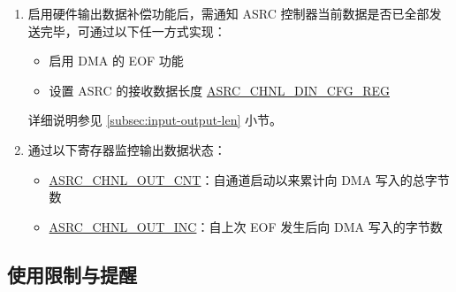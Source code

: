 \documentclass[main\_\_CN.tex]{subfiles}
\begin{document}
\begin{enumerate}
  \item 启用硬件输出数据补偿功能后，需通知 ASRC 控制器当前数据是否已全部发送完毕，可通过以下任一方式实现：

  \begin{itemize}
    \item 启用 DMA 的 EOF 功能
    \item 设置 ASRC 的接收数据长度 \hyperref[regdesc:ASRCCHNL0DINCFGREG]{ASRC\_CHNL\_DIN\_CFG\_REG}
  \end{itemize}

详细说明参见 \ref{subsec:input-output-len} \textit{} 小节。

\item 通过以下寄存器监控输出数据状态：

\begin{itemize}
   \item \hyperref[regdesc:ASRCCHNL0OUTCNTREG]{ASRC\_CHNL\_OUT\_CNT}：自通道启动以来累计向 DMA 写入的总字节数
   \item \hyperref[regdesc:ASRCCHNL0TRACE1REG]{ASRC\_CHNL\_OUT\_INC}：自上次 EOF 发生后向 DMA 写入的字节数
\end{itemize}

\end{enumerate}

\subsection{使用限制与提醒}
\label{subsec:usage-note}
\end{document}
